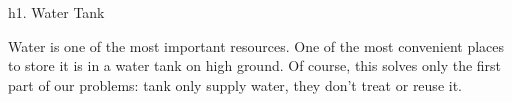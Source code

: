 h1. Water Tank

Water is one of the most important resources. One of the most convenient places to store it is in a water tank on high ground. Of course, this solves only the first part of our problems: tank only supply water, they don't treat or reuse it.